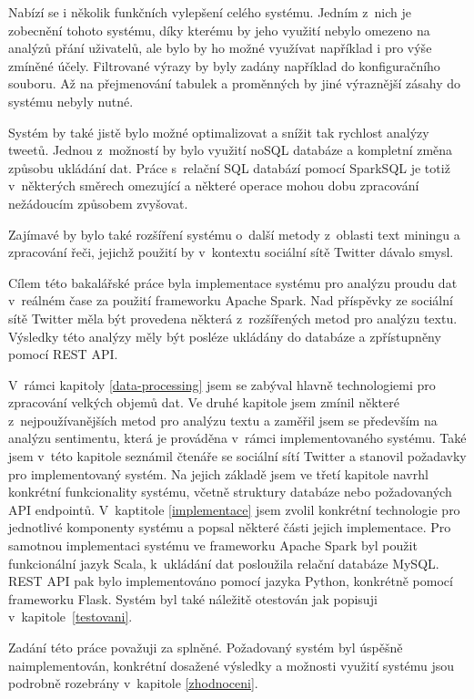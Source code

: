 \documentclass[thesis=B,czech]{FITthesis}[2012/06/26]
\begin{document}
Nabízí se i několik funkčních vylepšení celého systému. Jedním z~nich je zobecnění tohoto systému, díky kterému by jeho využití nebylo omezeno na analýzů přání uživatelů, ale bylo by ho možné využívat například i pro výše zmíněné účely. Filtrované výrazy by byly zadány například do konfiguračního souboru. Až na přejmenování tabulek a proměnných by jiné výraznější zásahy do systému nebyly nutné. 

Systém by také jistě bylo možné optimalizovat a snížit tak rychlost analýzy tweetů. Jednou z~možností by bylo využití noSQL databáze a kompletní změna způsobu ukládání dat. Práce s~relační SQL databází pomocí SparkSQL je totiž v~některých směrech omezující a některé operace mohou dobu zpracování nežádoucím způsobem zvyšovat. 

Zajímavé by bylo také rozšíření systému o~další metody z~oblasti text miningu a zpracování řeči, jejichž použití by v~kontextu sociální sítě Twitter dávalo smysl. 


\begin{conclusion}
	Cílem této bakalářské práce byla implementace systému pro analýzu proudu dat v~reálném čase za použití frameworku Apache Spark. Nad příspěvky ze sociální sítě Twitter měla být provedena některá z~rozšířených metod pro analýzu textu. Výsledky této analýzy měly být posléze ukládány do databáze a zpřístupněny pomocí REST API. 
	
	V~rámci kapitoly \ref{data-processing} jsem se zabýval hlavně technologiemi pro zpracování velkých objemů dat. Ve druhé kapitole jsem zmínil některé z~nejpoužívanějších metod pro analýzu textu a zaměřil jsem se především na analýzu sentimentu, která je prováděna v~rámci implementovaného systému. Také jsem v~této kapitole seznámil čtenáře se sociální sítí Twitter a stanovil požadavky pro implementovaný systém. Na jejich základě jsem ve třetí kapitole navrhl konkrétní funkcionality systému, včetně struktury databáze nebo požadovaných API \mbox{endpointů}. V~kaptitole \ref{implementace} jsem zvolil konkrétní technologie pro jednotlivé komponenty systému a popsal některé části jejich implementace. Pro samotnou implementaci systému ve frameworku Apache Spark byl použit funkcionální  jazyk Scala, k~ukládání dat posloužila relační databáze MySQL. REST API pak bylo implementováno pomocí jazyka Python, konkrétně pomocí frameworku Flask. Systém byl také náležitě otestován jak popisuji v~kapitole~\ref{testovani}. 
	
	Zadání této práce považuji za splněné. Požadovaný systém byl úspěšně naimplementován, konkrétní dosažené výsledky a možnosti využití systému jsou podrobně rozebrány v~kapitole \ref{zhodnoceni}. 
\end{conclusion}
\end{document}
